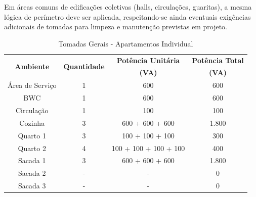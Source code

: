 \documentclass[12pt,openright,oneside,a4paper,brazil]{abntex2}
\begin{document}
Em áreas comuns de edificações coletivas (halls, circulações, guaritas), a
mesma lógica de perímetro deve ser aplicada, respeitando-se ainda eventuais
exigências adicionais de tomadas para limpeza e manutenção previstas em
projeto.

\begin{table}[H]
\centering
\caption{Tomadas Gerais - Apartamentos Individual}

\renewcommand{\arraystretch}{1.1} %
\setlength{\tabcolsep}{12pt}      %

\begin{tabular}{cccc}

\toprule
\multirow{2}{*}{\textbf{Ambiente}} & \multirow{2}{*}{\textbf{Quantidade}} & \textbf{Potência Unitária} & \textbf{Potência Total} \\
                                   &                                      & \textbf{(VA)}              & \textbf{(VA)}           \\
\midrule
Área de Serviço                    & 1                                    & 600                        & 600                     \\
BWC                                & 1                                    & 600                        & 600                     \\
Circulação                         & 1                                    & 100                        & 100                     \\
Cozinha                            & 3                                    & 600 + 600 + 600            & 1.800                   \\
Quarto 1                           & 3                                    & 100 + 100 + 100            & 300                     \\
Quarto 2                           & 4                                    & 100 + 100 + 100 + 100      & 400                     \\
Sacada 1                           & 3                                    & 600 + 600 + 600            & 1.800                   \\
Sacada 2                           & -                                    & -                          & 0                       \\
Sacada 3                           & -                                    & -                          & 0                       \\

\end{tabular}
\end{table}
\end{document}
